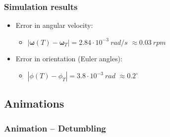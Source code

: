 \documentclass{beamer}
\begin{document}
\begin{frame} \frametitle{Simulation results}
	\begin{itemize}
		\item Error in angular velocity:
		\begin{itemize}
			\item[] \begin{center} $|\bm{\omega}(T)-\bm{\omega}_T| = 2.84\cdot 10^{-3}\ rad/s$ $\approx  0.03\ rpm$ \end{center}
		\end{itemize}
		\item Error in orientation (Euler angles):
		\begin{itemize}
			\item[] \begin{center} $|\phi(T)-\phi_T| = 3.8\cdot 10^{-3}\ rad$ $\approx  0.2^\circ$ \end{center}
		\end{itemize}
	\end{itemize}
\end{frame}

\subsection{Animations}
\begin{center}
	\begin{frame} \frametitle{Animation -- Detumbling}
	\end{frame}
\end{center}
\end{document}
